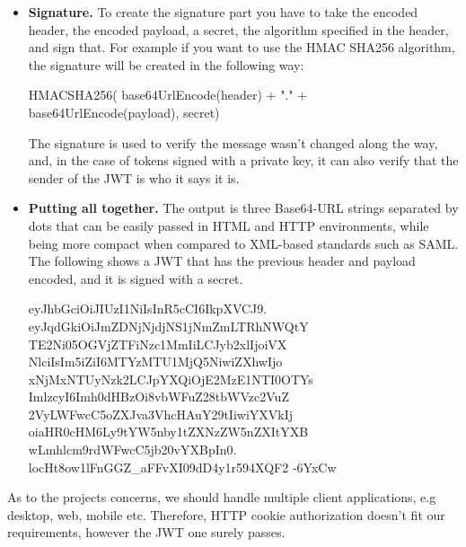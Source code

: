 \begin{itemize}
    \begin{spverbatim}
    {
        "sub": "1234567890",
        "name": "John Doe",
        "admin": true
    }
    \end{spverbatim}

    The payload is then Base64Url encoded to form the second part of the JSON Web Token.
    Do note that for signed tokens this information, though protected against tampering, is readable by anyone.
    Do not put secret information in the payload or header elements of a JWT unless it is encrypted.
    \item \textbf{Signature.} To create the signature part you have to take the encoded header, the encoded payload, a secret,
    the algorithm specified in the header, and sign that.
    For example if you want to use the HMAC SHA256 algorithm, the signature will be created in the following way:

    \begin{spverbatim}
        HMACSHA256(
        base64UrlEncode(header) + "." +
        base64UrlEncode(payload),
        secret)
    \end{spverbatim}

    The signature is used to verify the message wasn't changed along the way, and, in the case of tokens signed
    with a private key, it can also verify that the sender of the JWT is who it says it is.
    \item \textbf{Putting all together.} The output is three Base64-URL strings separated by dots that can be easily
    passed in HTML and HTTP environments, while being more compact when compared to XML-based standards such as SAML\@.
    The following shows a JWT that has the previous header and payload encoded, and it is signed with a secret.

    \begin{spverbatim}
        eyJhbGciOiJIUzI1NiIsInR5cCI6IkpXVCJ9.
        eyJqdGkiOiJmZDNjNjdjNS1jNmZmLTRhNWQtY
        TE2Ni05OGVjZTFiNzc1MmIiLCJyb2xlIjoiVX
        NlciIsIm5iZiI6MTYzMTU1MjQ5NiwiZXhwIjo
        xNjMxNTUyNzk2LCJpYXQiOjE2MzE1NTI0OTYs
        ImlzcyI6Imh0dHBzOi8vbWFuZ28tbWVzc2VuZ
        2VyLWFwcC5oZXJva3VhcHAuY29tIiwiYXVkIj
        oiaHR0cHM6Ly9tYW5nby1tZXNzZW5nZXItYXB
        wLmhlcm9rdWFwcC5jb20vYXBpIn0.
        locHt8ow1lFnGGZ_aFFvXI09dD4y1r594XQF2
        -6YxCw
    \end{spverbatim}

\end{itemize}

As to the projects concerns, we should handle multiple client applications, e.g desktop,
web, mobile etc.
Therefore, HTTP cookie authorization doesn't fit our requirements, however the JWT one surely passes.

